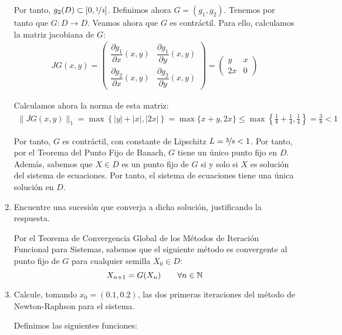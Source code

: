 \begin{ejercicio}
\begin{enumerate}
        Por tanto, $g_2(D)\subset [0,\nicefrac{1}{4}]$. Definimos ahora $G=(g_1,g_2)$. Tenemos por tanto que $G:D\to D$. Veamos ahora que $G$ es contráctil. Para ello, calculamos la matriz jacobiana de $G$:
        \begin{align*}
            JG(x,y)=\begin{pmatrix}
                \dfrac{\partial g_1}{\partial x}(x,y) & \dfrac{\partial g_1}{\partial y}(x,y)\\
                \dfrac{\partial g_2}{\partial x}(x,y) & \dfrac{\partial g_2}{\partial y}(x,y)
            \end{pmatrix}=\begin{pmatrix}
                y & x\\
                2x & 0
            \end{pmatrix}
        \end{align*}

        Calculamos ahora la norma de esta matriz:
        \begin{align*}
            \|JG(x,y)\|_1=\max\left\{|y|+|x|,|2x|\right\}=\max\{x+y,2x\}\leq \max\left\{\frac{1}{8}+\frac{1}{4},\frac{1}{4}\right\}=\frac{3}{8}<1
        \end{align*}

        Por tanto, $G$ es contráctil, con constante de Lipschitz $L=\nicefrac{3}{8}<1$. Por tanto, por el Teorema del Punto Fijo de Banach, $G$ tiene un único punto fijo en $D$. Además, sabemos que $X\in D$ es un punto fijo de $G$ si y solo si $X$ es solución del sistema de ecuaciones. Por tanto, el sistema de ecuaciones tiene una única solución en $D$.
        \item Encuentre una sucesión que converja a dicha solución, justificando la respuesta.
        
        Por el Teorema de Convergencia Global de los Métodos de Iteración Funcional para Sistemas, sabemos que el siguiente método es convergente al punto fijo de $G$ para cualquier semilla $X_0\in D$:
        \begin{equation*}
            X_{n+1}=G(X_n)\qquad \forall n\in \mathbb{N}
        \end{equation*}
        \item Calcule, tomando $x_0 = (0.1, 0.2)$, las dos primeras iteraciones del método de Newton-Raphson para el sistema.
        
        Definimos las siguientes funciones:


\end{enumerate}
\end{ejercicio}
